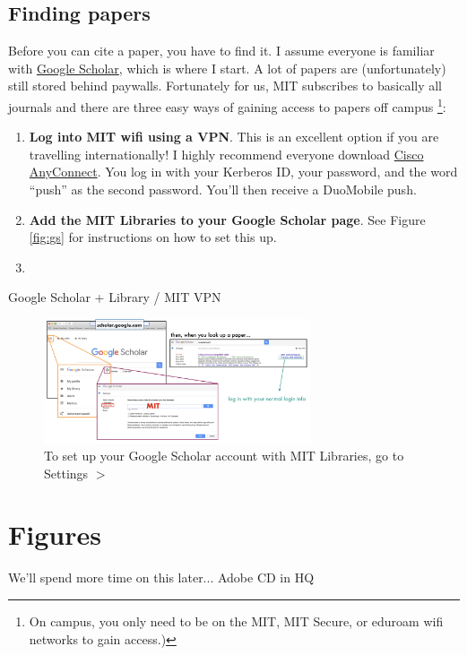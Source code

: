 \documentclass{article}
\begin{document}
\subsection*{Finding papers}
Before you can cite a paper, you have to find it. I assume everyone is familiar with \href{scholar.google.com}{Google Scholar}, which is where I start. A lot of papers are (unfortunately) still stored behind paywalls. Fortunately for us, MIT subscribes to basically all journals and there are three easy ways of gaining access to papers off campus \footnote{On campus, you only need to be on the MIT, MIT Secure, or eduroam wifi networks to gain access.)}:
\begin{enumerate}
    \item \textbf{Log into MIT wifi using a VPN}. This is an excellent option if you are travelling internationally! I highly recommend everyone download \href{https://ist.mit.edu/cisco-anyconnect}{Cisco AnyConnect}. You log in with your Kerberos ID, your password, and the word ``push'' as the second password. You'll then receive a DuoMobile push. 
    \item \textbf{Add the MIT Libraries to your Google Scholar page}. See Figure \ref{fig:gs} for instructions on how to set this up.
    \item 
\end{enumerate}
Google Scholar + Library / MIT VPN

\begin{figure}[h!]
    \centering
    \includegraphics[width=0.7\textwidth]{gs.png}
    \caption{To set up your Google Scholar account with MIT Libraries, go to Settings $>$  }
    \label{fig:bib}
\end{figure}

\section*{Figures}
We'll spend more time on this later... Adobe CD in HQ
\end{document}
